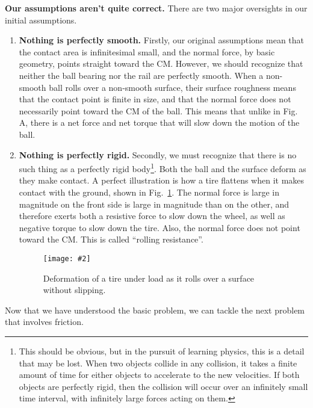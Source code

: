 \documentclass{../../../oss-handout}
\newcommand{\pic}[2]{\texttt{[image: \#2]}}
\begin{document}
\textbf{Our assumptions aren't quite correct.} There are two major oversights
in our initial assumptions.
\begin{enumerate}
\item\textbf{Nothing is perfectly smooth.} Firstly, our original assumptions
  mean that the contact area is infinitesimal small, and the normal force, by
  basic geometry, points straight toward the CM. However, we should recognize
  that neither the ball bearing nor the rail are perfectly smooth. When a
  non-smooth ball rolls over a non-smooth surface, their surface roughness
  means that the contact point is finite in size, and that the normal force
  does not necessarily point toward the CM of the ball. This means that unlike
  in Fig. A, there is a net force and net torque that will slow down the motion
  of the ball.
\item\textbf{Nothing is perfectly rigid.} Secondly, we must recognize that
  there is no such thing as a perfectly rigid body\footnote{This should be
    obvious, but in the pursuit of learning physics, this is a detail that may
    be lost. When two objects collide in any collision, it takes a finite
    amount of time for either objects to accelerate to the new velocities. If
    both objects are perfectly rigid, then the collision will occur over an
    infinitely small time interval, with infinitely large forces acting on
    them.}. Both the ball and the surface deform as they make contact. A
  perfect illustration is how a tire flattens when it makes contact with the
  ground, shown in Fig.~\ref{tire1}. The normal force is large in magnitude on
  the front side is large in magnitude than on the other, and therefore exerts
  both a resistive force to slow down the wheel, as well as negative torque to
  slow down the tire. Also, the normal force does not point toward the CM. This
  is called ``rolling resistance''.
  \begin{figure}[!ht]
    \centering
    \pic{.45}{OAGZy.png}
    \caption{Deformation of a tire under load as it rolls over a surface
      without slipping.}
     \label{tire1}
  \end{figure}
\end{enumerate}

Now that we have understood the basic problem, we can tackle the next problem
that involves friction.
\end{document}

